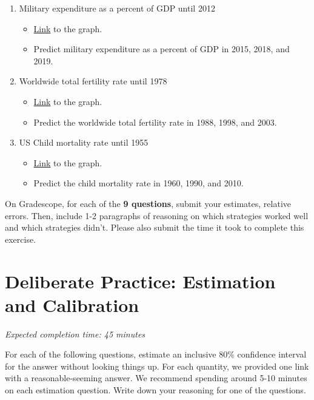\documentclass[11pt]{article}
\begin{document}
\begin{enumerate}
	\item Military expenditure as a percent of GDP until 2012
	\begin{itemize}
		\item \href{https://ourworldindata.org/grapher/military-expenditure-share-gdp-sipri?time=earliest..2012&country=~USA}{Link} to the graph.
		\item Predict military expenditure as a percent of GDP in 2015, 2018, and 2019.
	\end{itemize}

	\item Worldwide total fertility rate until 1978
	\begin{itemize}
		\item \href{https://ourworldindata.org/grapher/children-per-woman-UN?tab=chart&time=1950..1978}{Link} to the graph.
		\item Predict the worldwide total fertility rate in 1988, 1998, and 2003.
	\end{itemize}
	
	\item US Child mortality rate until 1955
	\begin{itemize}
		\item \href{https://ourworldindata.org/grapher/child-mortality?time=earliest..1955&country=~USA}{Link} to the graph.
		\item Predict the child mortality rate in 1960, 1990, and 2010.
	\end{itemize}
\end{enumerate}

On Gradescope, for each of the \textbf{9 questions}, submit your estimates, relative errors. Then, include 1-2 paragraphs of reasoning on which strategies worked well and which strategies didn't. Please also submit the time it took to complete this exercise.

\section*{Deliberate Practice: Estimation and Calibration}

\emph{Expected completion time: 45 minutes}

For each of the following questions, estimate an inclusive $80\%$ confidence interval for the answer without looking things up. For each quantity, we provided one link with a reasonable-seeming answer. We recommend spending around 5-10 minutes on each estimation question. Write down your reasoning for one of the questions. 
\end{document}
